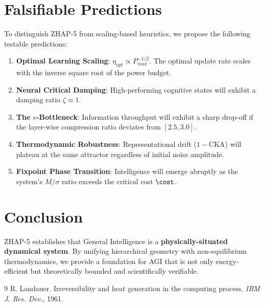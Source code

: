 \section{Falsifiable Predictions}
To distinguish ZHAP-5 from scaling-based heuristics, we propose the following testable predictions:
\begin{enumerate}
\item \textbf{Optimal Learning Scaling}: $\eta_{opt} \propto P_{max}^{-1/2}$. The optimal update rate scales with the inverse square root of the power budget.
\item \textbf{Neural Critical Damping}: High-performing cognitive states will exhibit a damping ratio $\zeta \approx 1$.
\item \textbf{The $e$-Bottleneck}: Information throughput will exhibit a sharp drop-off if the layer-wise compression ratio deviates from $[2.5, 3.0]$.
\item \textbf{Thermodynamic Robustness}: Representational drift ($1-\text{CKA}$) will plateau at the same attractor regardless of initial noise amplitude.
\item \textbf{Fixpoint Phase Transition}: Intelligence will emerge abruptly as the system's $M/\sigma$ ratio exceeds the critical cost $\cost$.
\end{enumerate}

\section{Conclusion}
ZHAP-5 establishes that General Intelligence is a \textbf{physically-situated dynamical system}. By unifying hierarchical geometry with non-equilibrium thermodynamics, we provide a foundation for AGI that is not only energy-efficient but theoretically bounded and scientifically verifiable.


\begin{thebibliography}{9}
 R. Landauer. Irreversibility and heat generation in the computing process. \textit{IBM J. Res. Dev.}, 1961.
\end{thebibliography}
